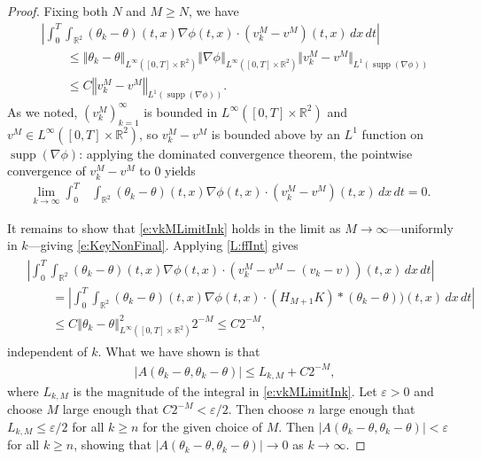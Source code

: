 \documentclass[10pt,a4paper]{amsart}
\def\R{{\mathbb R}}
\newcommand{\abs}[1]{\left\vert#1\right\vert}
\newcommand{\eps}{\ensuremath{\varepsilon}}
\newcommand{\grad}{\ensuremath{\nabla}}
\newcommand{\iny}{\ensuremath{\infty}}
\newcommand{\norm}[1]{\ensuremath{\left\Vert #1 \right\Vert}}
\newcommand{\smallnorm}[1]{\ensuremath{\Vert #1 \Vert}}
\DeclareMathOperator{\supp}{supp}
\begin{document}
\begin{proof}
    Fixing both $N$ and $M \ge N$, we have
    \begin{align*}
        &\abs{\int_0^T \int_{\R^2} (\theta_k - \theta)(t, x)
            \grad \phi(t,x) \cdot (v_k^M - v^M)(t, x)
            \, dx \, dt } \\
        &\qquad
        \le \norm{\theta_k - \theta}_{L^\iny([0, T] \times \R^2)}
        \norm{\grad \phi}_{L^\iny([0, T] \times \R^2)}
        \smallnorm{v_k^M - v^M}_{L^1(\supp(\grad \phi))} \\
        &\qquad
        \le C \norm{v_k^M - v^M}_{L^1(\supp(\grad \phi))}.
    \end{align*} 
    As we noted, $(v_k^M)_{k = 1}^\iny$ is bounded in $L^\iny([0, T] \times \R^2)$ and $v^M \in L^\iny([0, T] \times \R^2)$, so $v_k^M - v^M$ is bounded above by an $L^1$ function on $\supp(\grad \phi)$: applying the dominated convergence theorem, the pointwise convergence of $v_k^M - v^M$ to 0
    yields
    \begin{align}\label{e:vkMLimitInk}
        \lim_{k \to \iny} \int_0^T &\int_{\R^2}
        	(\theta_k - \theta)(t,x)
            \nabla\phi(t,x) \cdot (v_k^M - v^M)(t, x)
                \, dx \, dt
            = 0.
    \end{align}


	It remains to show that \cref{e:vkMLimitInk} holds in the limit
	as $M \to \iny$---uniformly in $k$---giving \cref{e:KeyNonFinal}.
	Applying \cref{L:ffInt}
	gives
	\begin{align}\label{e:vkMLimitInM}
		\begin{split}
		&\abs{\int_0^T \int_{\R^2}
        	(\theta_k - \theta)(t, x)
            \grad \phi(t,x) \cdot (v_k^M - v^M
            		- (v_k - v))(t, x)
                \, dx \, dt} \\
			&\qquad
			= \abs{\int_0^T \int_{\R^2}
	        	(\theta_k - \theta)(t, x)
    	        \grad  \phi(t,x) \cdot (H_{M + 1} K) *
	        		(\theta_k - \theta))(t, x)
            	    \, dx \, dt} \\
			&\qquad
			\le C \norm{\theta_k - \theta}_
					{L^\iny([0, T] \times \R^2)}^2
				2^{-M}
			\le C 2^{-M},
		\end{split}
	\end{align}
    independent of $k$.
	What we have shown is that
	\begin{align*}
		&\abs{A(\theta_k - \theta, \theta_k - \theta)}
            \le L_{k, M} + C 2^{-M},
	\end{align*}
	where $L_{k, M}$ is the magnitude of the integral in \cref{e:vkMLimitInk}.
    Let $\eps > 0$
	and choose $M$ large enough that $C 2^{-M} < \eps/2$.
	Then choose $n$ large enough that $L_{k, M}  \le \eps/2$ for all
	$k \ge n$ for the given choice of $M$. Then
	$\abs{A(\theta_k - \theta, \theta_k - \theta)} < \eps$ for all $k \ge n$,
	showing that $\abs{A(\theta_k - \theta, \theta_k - \theta)} \to 0$
	as $k \to \iny$.


\end{proof}
\end{document}
